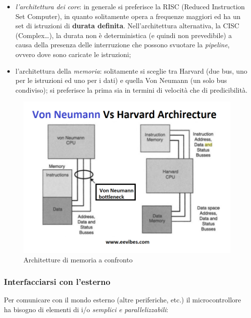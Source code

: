 \documentclass[
]{book}
\providecommand{\tightlist}{%
  \setlength{\itemsep}{0pt}\setlength{\parskip}{0pt}}
\begin{document}
\begin{itemize}
\tightlist
\item
  \emph{l'architettura dei core}: in generale si preferisce la RISC
  (Reduced Instruction Set Computer), in quanto solitamente opera a
  frequenze maggiori ed ha un set di istruzioni di \textbf{durata
  definita}. Nell'architettura alternativa, la CISC (Complex\ldots), la
  durata non è deterministica (e quindi non prevedibile) a causa della
  presenza delle interruzione che possono svuotare la \emph{pipeline},
  ovvero dove sono caricate le istruzioni;
\item
  l'architettura della \emph{memoria}: solitamente si sceglie tra
  Harvard (due bus, uno per le istruzioni ed uno per i dati) e quella
  Von Neumann (un solo bus condiviso); si preferisce la prima sia in
  termini di velocità che di predicibilità.
\end{itemize}

\begin{figure}
\centering
\includegraphics[width=0.4\linewidth,height=\textheight,keepaspectratio]{immagini/48.png}
\caption{Architetture di memoria a confronto}
\end{figure}

\subsubsection{Interfacciarsi con
l'esterno}\label{interfacciarsi-con-lesterno}

Per comunicare con il mondo esterno (altre periferiche, etc.) il
microcontrollore ha bisogno di elementi di i/o \emph{semplici e
parallelizzabili}:
\end{document}

